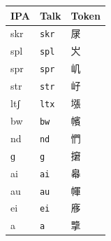 \begin{center}
\begin{tabular}{>{\ipafont}l l >{\clusterfont}l}
\toprule
IPA & Talk & Token \\
\midrule
skr & \texttt{skr} & 㞗 \\
spl & \texttt{spl} & 㞥 \\
spr & \texttt{spr} & 㞦 \\
str & \texttt{str} & 㞨 \\
ltʃ & \texttt{ltx} & 㙣 \\
bw & \texttt{bw} & 㡦 \\
nd & \texttt{nd} & 㥃 \\
ɡ & \texttt{g} & 㩈 \\
ai & \texttt{ai} & 㡍 \\
au & \texttt{au} & 㡓 \\
ei & \texttt{ei} & 㢋 \\
a & \texttt{a} & 㨼 \\
\bottomrule
\end{tabular}
\end{center}
